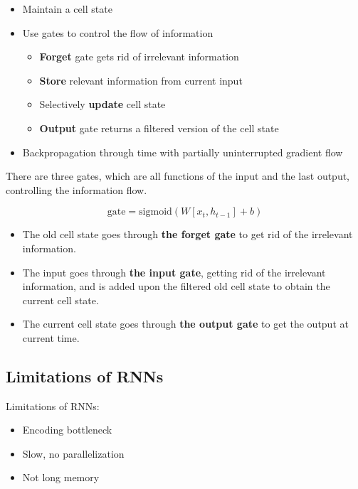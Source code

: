 \documentclass[12pt, a4paper, oneside]{article}
\begin{document}
\begin{itemize}
    \item Maintain a cell state
    \item Use gates to control the flow of information
    \begin{itemize}
        \item \textbf{Forget} gate gets rid of irrelevant information
        \item \textbf{Store} relevant information from current input
        \item Selectively \textbf{update} cell state
        \item \textbf{Output} gate returns a filtered version of the cell state
    \end{itemize}
    \item Backpropagation through time with partially uninterrupted gradient flow
\end{itemize}

There are three gates, which are all functions of the input and the last output, controlling the information flow.

\begin{equation*}
    \text{gate}=\text{sigmoid}(W[x_{t},h_{t-1}]+b)
\end{equation*}

\begin{itemize}
    \item The old cell state goes through \textbf{the forget gate} to get rid of the irrelevant information.
    \item The input goes through \textbf{the input gate}, getting rid of the irrelevant information, and is added upon the filtered old cell state to obtain the current cell state.
    \item The current cell state goes through \textbf{the output gate} to get the output at current time.
\end{itemize}

\subsection{Limitations of RNNs}

Limitations of RNNs:
\begin{itemize}
    \item Encoding bottleneck
    \item Slow, no parallelization
    \item Not long memory
\end{itemize}
\end{document}
